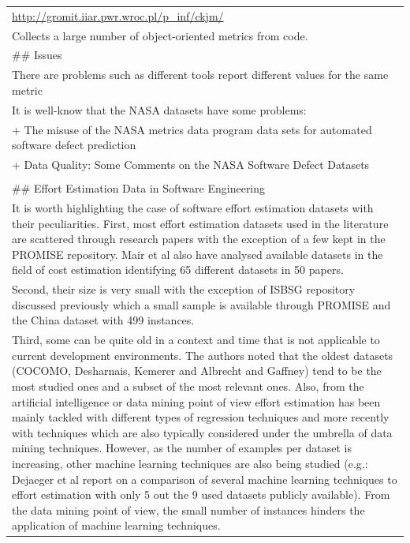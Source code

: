 \documentclass[
]{book}
\begin{document}
\begin{longtable}[]{@{}
  >{\raggedleft\arraybackslash}p{}@{}}
\url{http://gromit.iiar.pwr.wroc.pl/p_inf/ckjm/} \\
Collects a large number of object-oriented metrics from code. \\
\#\# Issues \\
There are problems such as different tools report different values for the same metric \citep{Lincke2008} \\
It is well-know that the NASA datasets have some problems: \\
+ \citep{Gray2011} The misuse of the NASA metrics data program data sets for automated software defect prediction \\
+ \citep{Shepperd2013} Data Quality: Some Comments on the NASA Software Defect Datasets \\
 \\
\#\# Effort Estimation Data in Software Engineering \\
It is worth highlighting the case of software effort estimation datasets with their peculiarities. First, most effort estimation datasets used in the literature are scattered through research papers with the exception of a few kept in the PROMISE repository. Mair et al \citeyearpar{MairSJ05} also have analysed available datasets in the field of cost estimation identifying 65 different datasets in 50 papers. \\
Second, their size is very small with the exception of ISBSG repository discussed previously which a small sample is available through PROMISE and the China dataset with 499 instances. \\
Third, some can be quite old in a context and time that is not applicable to current development environments. The authors noted that the oldest datasets (COCOMO, Desharnais, Kemerer and Albrecht and Gaffney) tend to be the most studied ones and a subset of the most relevant ones. Also, from the artificial intelligence or data mining point of view effort estimation has been mainly tackled with different types of regression techniques and more recently with techniques which are also typically considered under the umbrella of data mining techniques. However, as the number of examples per dataset is increasing, other machine learning techniques are also being studied (e.g.: Dejaeger et al \citeyearpar{Dejaeger_TSE12_EffEst} report on a comparison of several machine learning techniques to effort estimation with only 5 out the 9 used datasets publicly available). From the data mining point of view, the small number of instances hinders the application of machine learning techniques. \\

\end{longtable}
\end{document}
